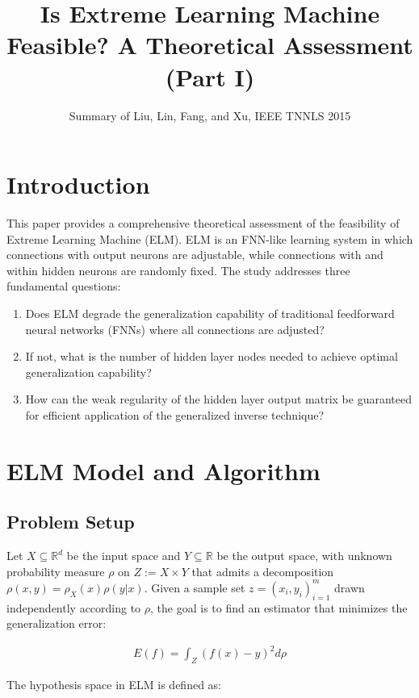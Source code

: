 \documentclass[11pt]{article}
\title{Is Extreme Learning Machine Feasible? A Theoretical Assessment (Part I)}
\author{Summary of Liu, Lin, Fang, and Xu, IEEE TNNLS 2015}
\date{}
\begin{document}
\maketitle

\section{Introduction}

This paper provides a comprehensive theoretical assessment of the feasibility of Extreme Learning Machine (ELM). ELM is an FNN-like learning system in which connections with output neurons are adjustable, while connections with and within hidden neurons are randomly fixed. The study addresses three fundamental questions:

\begin{enumerate}
    \item Does ELM degrade the generalization capability of traditional feedforward neural networks (FNNs) where all connections are adjusted?
    \item If not, what is the number of hidden layer nodes needed to achieve optimal generalization capability?
    \item How can the weak regularity of the hidden layer output matrix be guaranteed for efficient application of the generalized inverse technique?
\end{enumerate}

\section{ELM Model and Algorithm}

\subsection{Problem Setup}

Let $X \subseteq \mathbb{R}^d$ be the input space and $Y \subseteq \mathbb{R}$ be the output space, with unknown probability measure $\rho$ on $Z := X \times Y$ that admits a decomposition $\rho(x,y) = \rho_X(x)\rho(y|x)$. Given a sample set $z = (x_i, y_i)_{i=1}^m$ drawn independently according to $\rho$, the goal is to find an estimator that minimizes the generalization error:

\begin{align}
E(f) = \int_Z (f(x) - y)^2 d\rho
\end{align}

The hypothesis space in ELM is defined as:
\end{document}
